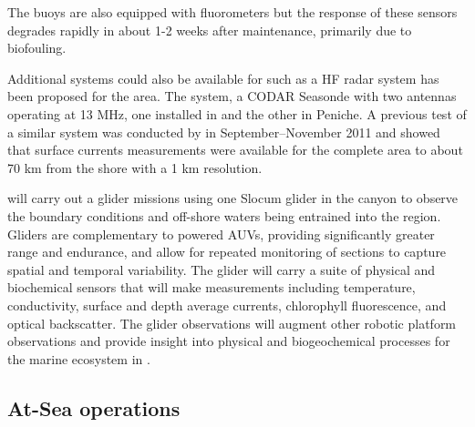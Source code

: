 \noindent
The buoys are also equipped with fluorometers but the response of these
sensors degrades rapidly in about 1-2 weeks after maintenance,
primarily due to biofouling.

Additional systems could also be available for \proj such as %
a HF radar system has been proposed for the \naz area. The system, a
CODAR Seasonde with two antennas operating at 13 MHz, one installed in
\naz and the other in Peniche. A previous test of a similar system was
conducted by \inst in September--November 2011 and showed that surface
currents measurements were available for the complete area to about 70
km from the shore with a 1 km resolution.

\soc will carry out a glider missions using one Slocum glider in the
\naz canyon to observe the boundary conditions and off-shore waters
being entrained into the region. %
Gliders are complementary to powered AUVs, providing significantly
greater range and endurance, and allow for repeated monitoring of
sections to capture spatial and temporal
variability. %
The \soc glider will carry a suite of physical and biochemical sensors
that will make measurements including temperature, conductivity,
surface and depth average currents, chlorophyll fluorescence, and
optical backscatter. The glider observations will augment other
robotic platform observations and provide insight into physical and
biogeochemical processes for the marine ecosystem in
\naze. %

  
\subsection{At-Sea operations}
\label{sec:atsea-ops}

